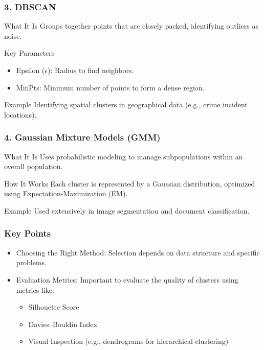 \documentclass[aspectratio=169]{beamer}
\begin{document}
\begin{frame}[fragile]
    \frametitle{3. DBSCAN}
    \begin{block}{What It Is}
        Groups together points that are closely packed, identifying outliers as noise.
    \end{block}

    \begin{block}{Key Parameters}
        \begin{itemize}
            \item Epsilon ($\epsilon$): Radius to find neighbors.
            \item MinPts: Minimum number of points to form a dense region.
        \end{itemize}
    \end{block}
    
    \begin{block}{Example}
        Identifying spatial clusters in geographical data (e.g., crime incident locations).
    \end{block}
\end{frame}

\begin{frame}[fragile]
    \frametitle{4. Gaussian Mixture Models (GMM)}
    \begin{block}{What It Is}
        Uses probabilistic modeling to manage subpopulations within an overall population.
    \end{block}

    \begin{block}{How It Works}
        Each cluster is represented by a Gaussian distribution, optimized using Expectation-Maximization (EM).
    \end{block}

    \begin{block}{Example}
        Used extensively in image segmentation and document classification.
    \end{block}
\end{frame}

\begin{frame}[fragile]
    \frametitle{Key Points}
    \begin{itemize}
        \item Choosing the Right Method: Selection depends on data structure and specific problems.
        \item Evaluation Metrics: Important to evaluate the quality of clusters using metrics like:
        \begin{itemize}
            \item Silhouette Score
            \item Davies–Bouldin Index
            \item Visual Inspection (e.g., dendrograms for hierarchical clustering)
        \end{itemize}
    \end{itemize}
\end{frame}
\end{document}
